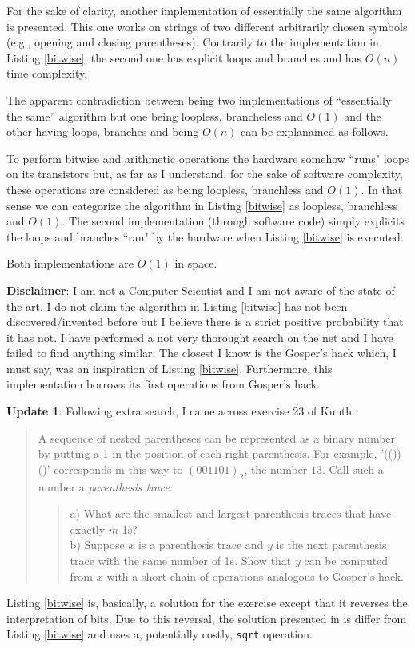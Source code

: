 \documentclass[a4paper]{article}
\begin{document}
For the sake of clarity, another implementation of essentially the same algorithm is presented.
This one works on strings of two different arbitrarily chosen symbols (e.g., opening and closing parentheses).
Contrarily to the implementation in Listing \ref{bitwise}, the second one has explicit loops and branches and has $O(n)$ time complexity.

The apparent contradiction between being two implementations of ``essentially the same'' algorithm but one being loopless, brancheless and $O(1)$ and the other having loops, branches and being $O(n)$ can be explanained as follows.

To perform bitwise and arithmetic operations the hardware somehow ``runs" loops on its transistors but, as far as I understand, for the sake of software complexity, these operations are considered as being loopless, branchless and $O(1)$.
In that sense we can categorize the algorithm in Listing \ref{bitwise} as loopless, branchless and $O(1)$.
The second implementation (through software code) simply explicits the loops and branches ``ran" by the hardware when Listing \ref{bitwise} is executed.

Both implementations are $O(1)$ in space.

{\bf Disclaimer}: I am not a Computer Scientist and I am not aware of the state of the art.
I do not claim the algorithm in Listing \ref{bitwise} has not been discovered/invented before but I believe there is a strict positive probability that it has not.
I have performed a not very thorought search on the net and I have failed to find anything similar.
The closest I know is the Gosper's hack \cite{Wikipedia-Combinatorial} which, I must say, was an inspiration of Listing \ref{bitwise}.
Furthermore, this implementation borrows its first operations from Gosper's hack.

{\bf Update 1}: Following extra search, I came across exercise 23 of Kunth \cite{Knuth}:

\begin{quote}
A sequence of nested parentheses can be represented as a binary number by putting a 1 in the position of each right parenthesis.
For example, '(())()' corresponds in this way to $(001101)_2$, the number $13$.
Call such a number a {\em parenthesis trace}.
\begin{quote}
a) What are the smallest and largest parenthesis traces that have exactly $m$ 1s? \\
b) Suppose $x$ is a parenthesis trace and $y$ is the next parenthesis trace with the same number of 1s.
Show that $y$ can be computed from $x$ with a short chain of operations analogous to Gosper's hack.
\end{quote}
\end{quote}
Listing \ref{bitwise} is, basically, a solution for the exercise except that it reverses the interpretation of bits.
Due to this reversal, the solution presented in \cite{Knuth} is differ from Listing \ref{bitwise} and uses a, potentially costly, \verb!sqrt! operation.
\end{document}
